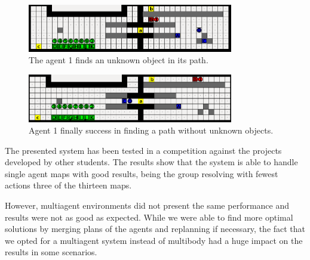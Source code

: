 \begin{figure}[htb]
\begin{center}
\includegraphics[width=0.8\textwidth]{figures/POMA_step1}
\caption{The agent 1 finds an unknown object in its path.}
\label{fig:poma_step1}
\end{center}

\end{figure}
\begin{figure}[htb]
\begin{center}
\includegraphics[width=0.8\textwidth]{figures/POMA_step2}
\caption{Agent 1 finally success in finding a path without unknown objects.}
\label{fig:poma_step2}
\end{center}
\end{figure}

The presented system has been tested in a competition against the projects developed by other students. The
results show that the system is able to handle single agent maps with good results, being the group resolving
with fewest actions three of the thirteen maps.

However, multiagent environments did not present the same performance and results were not as good as
expected. While we were able to find more optimal solutions by merging plans of the agents and replanning if
necessary, the fact that we opted for a multiagent system instead of multibody had a huge impact on the
results in some scenarios.
